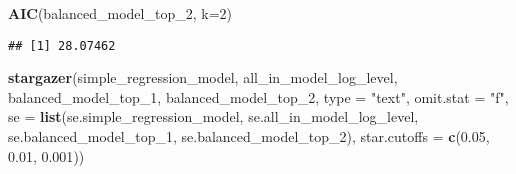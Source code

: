 \documentclass[
]{article}
\newenvironment{Shaded}{\begin{snugshade}}{\end{snugshade}}
\newcommand{\DataTypeTok}[1]{\textcolor[rgb]{0.13,0.29,0.53}{#1}}
\newcommand{\DecValTok}[1]{\textcolor[rgb]{0.00,0.00,0.81}{#1}}
\newcommand{\FloatTok}[1]{\textcolor[rgb]{0.00,0.00,0.81}{#1}}
\newcommand{\KeywordTok}[1]{\textcolor[rgb]{0.13,0.29,0.53}{\textbf{#1}}}
\newcommand{\NormalTok}[1]{#1}
\newcommand{\StringTok}[1]{\textcolor[rgb]{0.31,0.60,0.02}{#1}}
\begin{document}
\begin{Shaded}
\begin{Highlighting}[]
\KeywordTok{AIC}\NormalTok{(balanced_model_top_}\DecValTok{2}\NormalTok{, }\DataTypeTok{k=}\DecValTok{2}\NormalTok{)}
\end{Highlighting}
\end{Shaded}

\begin{verbatim}
## [1] 28.07462
\end{verbatim}

\begin{Shaded}
\begin{Highlighting}[]
\KeywordTok{stargazer}\NormalTok{(simple_regression_model, all_in_model_log_level, balanced_model_top_}\DecValTok{1}\NormalTok{, balanced_model_top_}\DecValTok{2}\NormalTok{,}
          \DataTypeTok{type =} \StringTok{"text"}\NormalTok{, }\DataTypeTok{omit.stat =} \StringTok{"f"}\NormalTok{,}
          \DataTypeTok{se =} \KeywordTok{list}\NormalTok{(se.simple_regression_model, se.all_in_model_log_level, }
\NormalTok{                    se.balanced_model_top_}\DecValTok{1}\NormalTok{, se.balanced_model_top_}\DecValTok{2}\NormalTok{),}
          \DataTypeTok{star.cutoffs =} \KeywordTok{c}\NormalTok{(}\FloatTok{0.05}\NormalTok{, }\FloatTok{0.01}\NormalTok{, }\FloatTok{0.001}\NormalTok{))}
\end{Highlighting}
\end{Shaded}
\end{document}
